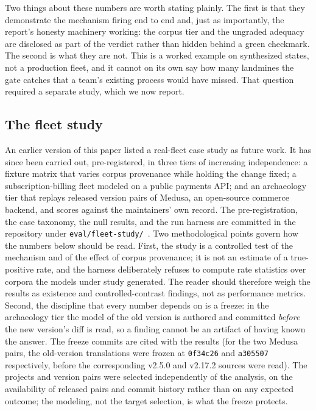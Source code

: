 \documentclass[11pt]{article}
\newcommand{\code}[1]{\texttt{#1}}
\begin{document}
Two things about these numbers are worth stating plainly. The first is that they
demonstrate the mechanism firing end to end and, just as importantly, the
report's honesty machinery working: the corpus tier and the ungraded adequacy are
disclosed as part of the verdict rather than hidden behind a green checkmark. The
second is what they are not. This is a worked example on synthesized states, not
a production fleet, and it cannot on its own say how many landmines the gate
catches that a team's existing process would have missed. That question required
a separate study, which we now report.

\subsection{The fleet study}\label{sub:fleetstudy}

An earlier version of this paper listed a real-fleet case study as future work.
It has since been carried out, pre-registered, in three tiers of increasing
independence: a fixture matrix that varies corpus provenance while holding the
change fixed; a subscription-billing fleet modeled on a public payments API; and
an archaeology tier that replays released version pairs of Medusa, an
open-source commerce backend, and scores against the maintainers' own record.
The pre-registration, the case taxonomy, the null results, and the run harness
are committed in the repository under \code{eval/fleet-study/}~\cite{repo}. Two
methodological points govern how the numbers below should be read. First, the
study is a controlled test of the mechanism and of the effect of corpus
provenance; it is not an estimate of a true-positive rate, and the harness
deliberately refuses to compute rate statistics over corpora the models under
study generated. The reader should therefore weigh the results as existence and
controlled-contrast findings, not as performance metrics. Second, the discipline
that every number depends on is a freeze: in the archaeology tier the model of
the old version is authored and committed \emph{before} the new version's diff is
read, so a finding cannot be an artifact of having known the answer. The freeze
commits are cited with the results (for the two Medusa pairs, the old-version
translations were frozen at \code{0f34c26} and \code{a305507} respectively,
before the corresponding v2.5.0 and v2.17.2 sources were read). The projects and
version pairs were selected independently of the analysis, on the availability of
released pairs and commit history rather than on any expected outcome; the
modeling, not the target selection, is what the freeze protects.
\end{document}
